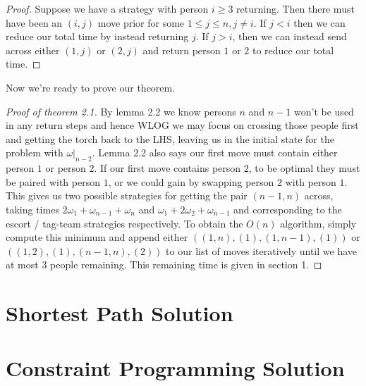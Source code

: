 \documentclass[11pt]{article}
\theoremstyle{definition}
\begin{document}
\begin{proof}
    Suppose we have a strategy with person $i \geq 3$ returning. Then there must have been an $(i, j)$ move prior 
    for some $1 \leq j \leq n, j \neq i$. If $j < i$ then we can reduce our total time by instead returning $j$.
    If $j > i$, then we can instead send across either $(1, j)$ or $(2, j)$ and return person $1$ or $2$ to reduce 
    our total time. 
\end{proof}

Now we're ready to prove our theorem.  

\begin{proof}[Proof of theorem 2.1]
    By lemma 2.2 we know persons $n$ and $n-1$ won't be used in any return steps and hence WLOG we may focus on 
    crossing those people first and getting the torch back to the LHS, leaving us in the initial state for the problem 
    with $\omega \vert_{n-2}$. Lemma 2.2 also says our first move must contain either person $1$ or person $2$. If 
    our first move contains person $2$, to be optimal they must be paired with person $1$, or we could gain by swapping 
    person $2$ with person $1$. This gives us two possible strategies for getting the pair $(n-1, n)$ across, taking 
    times $2 \omega_1 + \omega_{n-1} + \omega_{n}$ and $\omega_1 + 2 \omega_2 + \omega_{n-1}$ and corresponding to 
    the escort / tag-team strategies respectively. To obtain the $O(n)$ algorithm, simply compute this minimum and 
    append either $((1, n), (1), (1, n-1), (1))$ or $((1,2), (1), (n-1, n), (2))$ to our list of moves iteratively 
    until we have at most $3$ people remaining. This remaining time is given in section 1.
\end{proof}

\section{Shortest Path Solution}

\section{Constraint Programming Solution}
\end{document}
